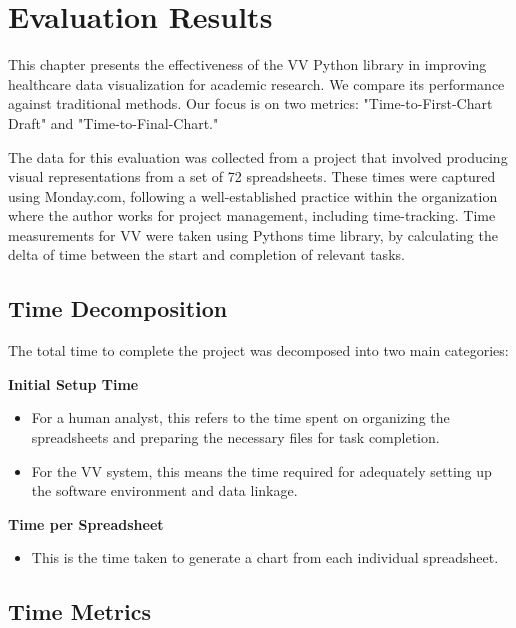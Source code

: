 \chapter{Evaluation Results}\label{evaluation-results}

\minitoc

This chapter presents the effectiveness of the VV Python library in
improving healthcare data visualization for academic research. We
compare its performance against traditional methods. Our focus is on two
metrics: "Time-to-First-Chart Draft" and "Time-to-Final-Chart."

The data for this evaluation was collected from a project that involved
producing visual representations from a set of 72 spreadsheets. These
times were captured using Monday.com, following a well-established
practice within the organization where the author works for project
management, including time-tracking. Time measurements for VV were taken
using Python\textquotesingle s time library, by calculating the delta of
time between the start and completion of relevant tasks.

\section{Time Decomposition}\label{time-decomposition}

The total time to complete the project was decomposed into two main
categories:

\textbf{Initial Setup Time}

\begin{itemize}
\item
  For a human analyst, this refers to the time spent on organizing the
  spreadsheets and preparing the necessary files for task completion.
\item
  For the VV system, this means the time required for adequately setting
  up the software environment and data linkage.
\end{itemize}

\textbf{Time per Spreadsheet}

\begin{itemize}
\item
  This is the time taken to generate a chart from each individual
  spreadsheet.
\end{itemize}

\section{Time Metrics}\label{time-metrics}

